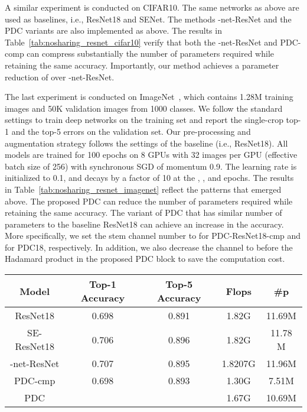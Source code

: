 \documentclass[runningheads]{llncs}
\newcommand{\resnet}{ResNet}
\newcommand{\modelres}{-net-\resnet}
\newcommand{\sne}{SENet}
\newcommand{\noshare}{PDC}
\providecommand\ie{i.e.,}
\begin{document}
A similar experiment is conducted on CIFAR10. 
The same networks as above are used as baselines, \ie{} \resnet18 and \sne{}. The methods \modelres{} and the \noshare{} variants are also implemented as above. The results in Table~\ref{tab:nosharing_resnet_cifar10} verify that both the \modelres{} and \noshare-comp can compress substantially the number of parameters required while retaining the same accuracy. Importantly, our method achieves a  parameter reduction of  over \modelres. 

     


The last experiment is conducted on ImageNet~\cite{deng2009imagenet}, which contains 1.28M training images and 50K validation images from 1000 classes. We follow the standard settings to train 
deep networks on the training set and report the single-crop top-1 and the top-5 errors on the validation set. Our pre-processing and augmentation strategy follows the settings of the baseline (i.e., \resnet18). All models are trained for 100 epochs on 8  
GPUs with 32 images per GPU (effective batch size of 256) with synchronous SGD of momentum 0.9. The learning rate is initialized to 0.1, and decays by a factor of 10 at the , , and  epochs. The results in Table~\ref{tab:nosharing_resnet_imagenet} reflect the patterns that emerged above. The proposed \noshare{} can reduce the number of parameters  required while retaining the same accuracy. The variant of \noshare{} that has similar number of parameters to the baseline \resnet18 can achieve an increase in the accuracy. More specifically, we set the stem channel number to  for PDC-ResNet18-cmp and  for \noshare18, respectively. In addition, we also decrease the channel to  before the Hadamard product in the proposed PDC block to save the computation cost.


\begin{table*}[h]
\caption{Image classification on ImageNet with variants of \resnet18.}
\centering
    \begin{tabular}{|c | c | c| c | c |}
    \hline
    Model   & Top-1 Accuracy & Top-5 Accuracy & Flops  & \textbf{\#p} \\
    \hline
        ResNet18        & 0.698 &  0.891 & 1.82G & 11.69M \\
        SE-ResNet18     & 0.706 &  0.896 & 1.82G  &  11.78 M  \\
        \modelres       & 0.707 &  0.895 &  1.8207G     & 11.96M  \\
        \noshare-cmp    & 0.698 &  0.893 &1.30G & 7.51M \\
        \noshare    &   &     & 1.67G  & 10.69M \\

    \hline
    \end{tabular}
\label{tab:nosharing_resnet_imagenet}
\end{table*}
\end{document}
